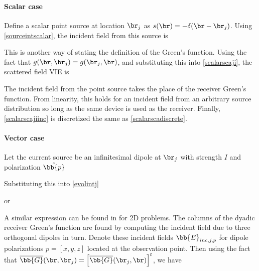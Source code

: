 \paragraph{Scalar case}

Define a scalar point source at location $\br_j$ as $s(\br) = -\delta(\br - \br_j)$. Using \eqref{sourceintscalar}, the incident field from this source is

This is another way of stating the definition of the Green's function. Using the fact that $g(\br,\br_j) = g(\br_j,\br)$, and substituting this into \eqref{scalarscaji}, the scattered field VIE is

The incident field from the point source takes the place of the receiver Green's function. From linearity, this holds for an incident field from an arbitrary source distribution so long as the same device is used as the receiver. Finally, \eqref{scalarscajiinc} is discretized the same as \eqref{scalarscadiscrete}. 

\paragraph{Vector case}

Let the current source be an infinitesimal dipole at $\br_j$ with strength $I$ and polarization $\hat{\bb{p}}$

Substituting this into \eqref{evolintj}

or

A similar expression can be found in \cite{cui2004study} for 2D problems. The columns of the dyadic receiver Green's function are found by computing the incident field due to three orthogonal dipoles in turn. Denote these incident fields $\bb{E}_{inc,j,p}$ for dipole polarizations $p = [x, y, z]$ located at the observation point. Then using the fact that $\overline{\bb{G}}(\br,\br_j) = \left[ \overline{\bb{G}}(\br_j,\br)\right]^{t}$, we have

